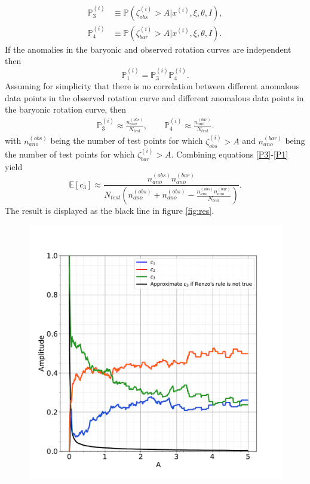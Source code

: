 \begin{example}
\begin{equation}
		\begin{split}
			\mathbb{P}_3^{(i)}& \equiv\mathbb{P}(\zeta^{(i)}_{obs}>A|x^{(i)},\xi,\theta,I),\\
			\mathbb{P}_4^{(i)}& \equiv\mathbb{P}(\zeta^{(i)}_{bar}>A|x^{(i)},\xi,\theta,I).
		\end{split}
	\end{equation}
	If the anomalies in the baryonic and observed rotation curves are independent then 
	\begin{equation}
		\mathbb{P}_1^{(i)} = \mathbb{P}_3^{(i)}\mathbb{P}_4^{(i)}.
		\label{P2}
	\end{equation}
	Assuming for simplicity that there is no correlation between different anomalous data points in the observed rotation curve and different anomalous data points in the baryonic rotation curve, then
	\begin{equation}
		\begin{split}
			\mathbb{P}_3^{(i)}\approx  \frac{n_{ano}^{(obs)}}{N_{test}}, \qquad
			\mathbb{P}_4^{(i)}\approx \frac{n_{ano}^{(bar)}}{N_{test}}.
		\end{split}
		\label{P1}
	\end{equation}
	with $n_{ano}^{(obs)}$ being the number of test points for which $\zeta^{(i)}_{obs}>A$ and $n_{ano}^{(bar)}$ being the number of test points for which $\zeta^{(i)}_{bar}>A$. Combining equations \eqref{P3}-\eqref{P1} yield
	\begin{equation}
		\mathbb{E}[c_3]\approx\frac{n_{ano}^{(obs)}n_{ano}^{(bar)}}{N_{test}\left(n_{ano}^{(obs)}+n_{ano}^{(obs)}-\frac{n_{ano}^{(obs)}n_{ano}^{(bar)}}{N_{test}}\right)}.
		\label{P4}
	\end{equation}
	The result is displayed as the black line in figure \ref{fig:res}. 
	\begin{figure}[ht]
		\centering
		\includegraphics[width=1\textwidth]{figures/res.pdf}

\end{figure}
\end{example}
